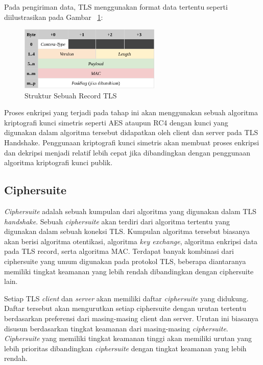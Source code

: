     Pada pengiriman data, TLS menggunakan format data tertentu seperti diilustrasikan pada Gambar ~\ref{fig:tls-record}:
    \begin{figure}[h]
      \centering
      \includegraphics[width=0.6\textwidth]{resources/ch-2/tls-record.png}
      \caption{Struktur Sebuah Record TLS \protect\citep{rfc5246}}
      \label{fig:tls-record}
    \end{figure}


    Proses enkripsi yang terjadi pada tahap ini akan menggunakan sebuah algoritma kriptografi kunci simetris seperti AES ataupun RC4 dengan kunci yang digunakan dalam algoritma tersebut didapatkan oleh client dan server pada TLS Handshake. Penggunaan kriptografi kunci simetris akan membuat proses enkripsi dan dekripsi menjadi relatif lebih cepat jika dibandingkan dengan penggunaan algoritma kriptografi kunci publik.


  \subsection{Ciphersuite}
    \textit{Ciphersuite} adalah sebuah kumpulan dari algoritma yang digunakan dalam TLS \textit{handshake}. Sebuah \textit{ciphersuite} akan terdiri dari algoritma tertentu yang digunakan dalam sebuah koneksi TLS. Kumpulan algoritma tersebut biasanya akan berisi algoritma otentikasi, algoritma \textit{key exchange}, algoritma enkripsi data pada TLS record, serta algoritma MAC. Terdapat banyak kombinasi dari ciphersuite yang umum digunakan pada protokol TLS, beberapa diantaranya memiliki tingkat keamanan yang lebih rendah dibandingkan dengan ciphersuite lain.

    Setiap TLS \textit{client} dan \textit{server} akan memiliki daftar \textit{ciphersuite} yang didukung. Daftar tersebut akan mengurutkan setiap ciphersuite dengan urutan tertentu berdasarkan preferensi dari masing-masing client dan server. Urutan ini biasanya disusun berdasarkan tingkat keamanan dari masing-masing \textit{ciphersuite}. \textit{Ciphersuite} yang memiliki tingkat keamanan tinggi akan memiliki urutan yang lebih prioritas dibandingkan \textit{ciphersuite} dengan tingkat keamanan yang lebih rendah.

